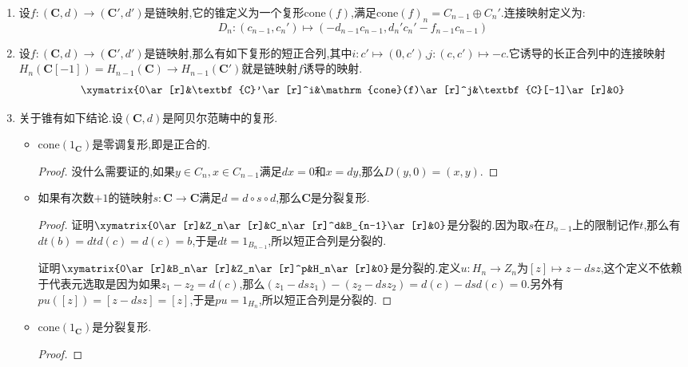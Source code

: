 \begin{enumerate}
\begin{proof}
    	按照分裂条件有$\textbf{C}\cong\oplus_{k\in\mathbb{Z}}\Sigma^k(\delta_k)$.按照每个$0\to Z_k\to C_k\to B_{k-1}\to0$是分裂的,说明$\Sigma^k(Z_k\to C_k)$是$\Sigma^k(1_{C_k})$的直和项,我们解释过$\Sigma^k(1_{C_k})$是投射复形,另外投射对象的直和项是投射的,所以$\Sigma^k(Z_k\to C_k)$也是投射复形,所以$Z_k$是投射对象.所以$\Sigma^k(1_{Z_k})$也是投射复形.再按照每个$0\to B_k\to Z_k\to H_k\to0$是分裂短正合列,说明$\Sigma^k(B_k\to Z_k)$是投射复形$\Sigma^k(1_{Z_k})$的直和项,所以$\Sigma^k(\delta_k)$也是投射复形,所以投射复形的直和$\textbf{C}\cong\oplus_{k\in\mathbb{Z}}\Sigma^k(\delta_k)$是投射复形.
    \end{proof}
    \item 设$f:(\textbf{C},d)\to(\textbf{C}',d')$是链映射,它的锥定义为一个复形$\mathrm{cone}(f)$,满足$\mathrm{cone}(f)_n=C_{n-1}\oplus C_n'$.连接映射定义为:
    $$D_n:(c_{n-1},c_n')\mapsto(-d_{n-1}c_{n-1},d_n'c_n'-f_{n-1}c_{n-1})$$
    \item 设$f:(\textbf{C},d)\to(\textbf{C}',d')$是链映射,那么有如下复形的短正合列,其中$i:c'\mapsto(0,c')$,$j:(c,c')\mapsto -c$.它诱导的长正合列中的连接映射$H_n(\textbf{C}[-1])=H_{n-1}(\textbf{C})\to H_{n-1}(\textbf{C}')$就是链映射$f$诱导的映射.
    $$\xymatrix{0\ar[r]&\textbf{C}'\ar[r]^i&\mathrm{cone}(f)\ar[r]^j&\textbf{C}[-1]\ar[r]&0}$$
    \item 关于锥有如下结论.设$(\textbf{C},d)$是阿贝尔范畴中的复形.
    \begin{itemize}
    	\item $\mathrm{cone}(1_{\textbf{C}})$是零调复形,即是正合的.
    	\begin{proof}
    		
    		没什么需要证的,如果$y\in C_n,x\in C_{n-1}$满足$dx=0$和$x=dy$,那么$D(y,0)=(x,y)$.
    	\end{proof}
    	\item 如果有次数$+1$的链映射$s:\textbf{C}\to\textbf{C}$满足$d=d\circ s\circ d$,那么$\textbf{C}$是分裂复形.
    	\begin{proof}
    		
    		证明$\xymatrix{0\ar[r]&Z_n\ar[r]&C_n\ar[r]^d&B_{n-1}\ar[r]&0}$是分裂的.因为取$s$在$B_{n-1}$上的限制记作$t$,那么有$dt(b)=dtd(c)=d(c)=b$,于是$dt=1_{B_{n-1}}$,所以短正合列是分裂的.
    		
    		\qquad
    		
    		证明$\xymatrix{0\ar[r]&B_n\ar[r]&Z_n\ar[r]^p&H_n\ar[r]&0}$是分裂的.定义$u:H_n\to Z_n$为$[z]\mapsto z-dsz$,这个定义不依赖于代表元选取是因为如果$z_1-z_2=d(c)$,那么$(z_1-dsz_1)-(z_2-dsz_2)=d(c)-dsd(c)=0$.另外有$pu([z])=[z-dsz]=[z]$,于是$pu=1_{H_n}$,所以短正合列是分裂的.
    	\end{proof}
    	\item $\mathrm{cone}(1_{\textbf{C}})$是分裂复形.
    	\begin{proof}
    		

\end{proof}
\end{itemize}
\end{enumerate}
